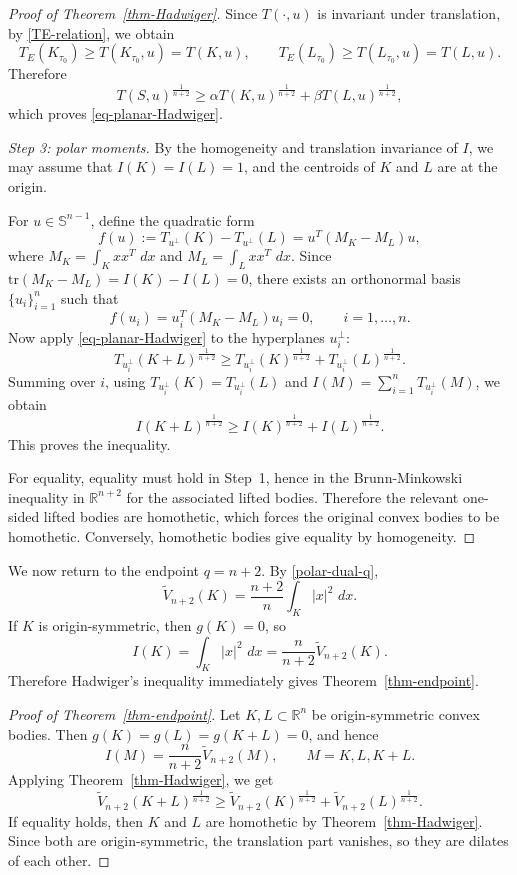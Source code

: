 \documentclass[12pt,leqno]{amsart}
\theoremstyle{plain} \newtheorem{thm}{Theorem}[section]
\theoremstyle{plain} \newtheorem{prop}[thm]{Proposition}
\theoremstyle{plain} \newtheorem{prob}[thm]{Problem}
\theoremstyle{definition} \newtheorem{defi}[thm]{Definition}
\theoremstyle{plain} \newtheorem{cor}[thm]{Corollary}
\theoremstyle{plain} \newtheorem{lem}[thm]{Lemma}
\theoremstyle{plain} \newtheorem{eg}{Example}[section]
\theoremstyle{remark} \newtheorem{rmk}[thm]{Remark}
\theoremstyle{plain} \newtheorem{conj}{Conjecture}
\numberwithin{equation}{section}
\newcommand{\bS}{\mathbb{S}}
\newcommand{\tr}{\mathrm{tr}}
\newcommand{\tV}{\widetilde V}
\newcommand{\dd}{\,d}
\newcommand{\R}{\mathbb{R}}
\begin{document}
\begin{proof}[Proof of Theorem~\ref{thm-Hadwiger}]
Since $T(\cdot,u)$ is invariant under translation, by \eqref{TE-relation}, we obtain
\[
T_E(K_{\tau_0})\ge T(K_{\tau_0},u)=T(K,u), \qquad T_E(L_{\tau_0})\ge T(L_{\tau_0},u)=T(L,u).
\]
Therefore
\[
T(S,u)^{\frac1{n+2}}
\ge \alpha T(K,u)^{\frac1{n+2}}+\beta T(L,u)^{\frac1{n+2}},
\]
which proves \eqref{eq-planar-Hadwiger}.

\smallskip
\noindent\emph{Step 3: polar moments.}
By the homogeneity and translation invariance of \(I\), we may assume that $I(K)=I(L)=1$, and the centroids of \(K\) and \(L\) are at the origin.

For $u\in\bS^{n-1}$, define the quadratic form
\[f(u):=T_{u^\perp}(K)-T_{u^\perp}(L)=u^T(M_K-M_L)u,\]
where $M_K=\int_K xx^T\,\dd x$ and $M_L=\int_L xx^T\,\dd x$. Since $ \tr (M_K-M_L)=I(K)-I(L)=0$, there exists an orthonormal basis \( \{u_i\}_{i=1}^n\) such that
\[
    f(u_i)= u_i^T (M_K-M_L) u_i=0,\qquad i=1,\dots,n.
\]
Now apply \eqref{eq-planar-Hadwiger} to the hyperplanes $u_i^\perp$:
\[
    T_{u_i^\perp}(K+L)^{\frac1{n+2}}
    \ge T_{u_i^\perp}(K)^{\frac1{n+2}}+T_{u_i^\perp}(L)^{\frac1{n+2}}.
\]
Summing over $i$, using $T_{u_i^\perp}(K)=T_{u_i^\perp}(L)$ and $I(M)=\sum_{i=1}^n T_{u_i^\perp}(M)$, we obtain
\[
    I(K+L)^{\frac1{n+2}}\ge I(K)^{\frac1{n+2}}+I(L)^{\frac1{n+2}}.
\]
This proves the inequality.

For equality, equality must hold in Step~1, hence in the Brunn-Minkowski inequality in $\R^{n+2}$ for the associated lifted bodies. Therefore the relevant one-sided lifted bodies are homothetic, which forces the original convex bodies to be homothetic. Conversely, homothetic bodies give equality by homogeneity.
\end{proof}

We now return to the endpoint $q=n+2$. By \eqref{polar-dual-q},
\[
    \tV_{n+2}(K)=\frac{n+2}{n}\int_K |x|^2\,\dd x.
\]
If $K$ is origin-symmetric, then $g(K)=0$, so
\[
    I(K)=\int_K |x|^2\,\dd x=\frac{n}{n+2}\tV_{n+2}(K).
\]
Therefore Hadwiger's inequality immediately gives Theorem~\ref{thm-endpoint}.

\begin{proof}[Proof of Theorem~\ref{thm-endpoint}]
Let $K,L\subset\R^n$ be origin-symmetric convex bodies. Then $g(K)=g(L)=g(K+L)=0$, and hence
\[
    I(M)=\frac{n}{n+2}\tV_{n+2}(M),\qquad M=K,L,K+L.
\]
Applying Theorem~\ref{thm-Hadwiger}, we get
\[
    \tV_{n+2}(K+L)^{\frac1{n+2}}
    \ge \tV_{n+2}(K)^{\frac1{n+2}}+\tV_{n+2}(L)^{\frac1{n+2}}.
\]
If equality holds, then $K$ and $L$ are homothetic by Theorem~\ref{thm-Hadwiger}. Since both are origin-symmetric, the translation part vanishes, so they are dilates of each other.
\end{proof}
\end{document}
